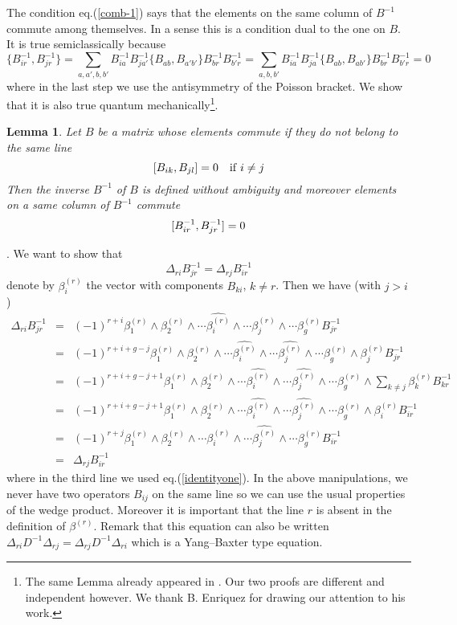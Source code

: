 \documentclass[a4paper,11pt]{article}
\newtheorem{lemma}{Lemma}
\def\proof{\noindent  {\underline {Proof}}. }
\def\square{ {\hfill \vrule height6pt width6pt depth1pt} \bigskip \medskip }
\begin{document}
The condition eq.(\ref{comb-1}) says that the elements on the same column of 
$B^{-1}$  commute among
themselves. In a sense this is a condition dual to the one on $B$. It is true 
semiclassically because
$$
\{ B^{-1}_{ir}, B^{-1}_{jr} \} = \sum_{a,a',b,b'} B^{-1}_{ia} B^{-1}_{ja'}
\{ B_{ab}, B_{a'b'} \} B^{-1}_{br} B^{-1}_{b'r} =
\sum_{a,b,b'} B^{-1}_{ia} B^{-1}_{ja}
\{ B_{ab}, B_{ab'} \} B^{-1}_{br} B^{-1}_{b'r}=0
$$
where in the last step we use the antisymmetry of the Poisson bracket.
We show that it is also true quantum mechanically\footnote{The same Lemma already appeared in  \cite{ER01}. Our two proofs are different and independent however.   We thank B. Enriquez for drawing our attention to his work.}.
\begin{lemma}
Let $B$ be a matrix whose elements commute if they do not belong 
to the same line
$$
\relax [ B_{ik} , B_{jl} ] = 0 \quad {\rm if } \; i \neq j
$$
Then the inverse $B^{-1}$ of $B$ is defined without ambiguity and
moreover elements on a same column of $B^{-1}$ commute
$$
\relax  [ B^{-1}_{ir} , B^{-1}_{jr} ] = 0 
$$
\end{lemma}
\proof
We want to show that
$$
\Delta_{ri}B^{-1}_{jr} = \Delta_{rj}B^{-1}_{ir}
$$
denote by $\beta_i^{(r)}$ the vector with components $B_{ki}$, $k \neq r$. Then
we have (with $j>i$)
\begin{eqnarray*}
\Delta_{ri}B^{-1}_{jr} &=& (-1)^{r+i}
 \beta^{(r)}_1 \wedge \beta^{(r)}_2 \wedge \cdots \widehat{ \beta^{(r)}_i} 
\wedge \cdots \beta^{(r)}_j \wedge \cdots\beta^{(r)}_g 
B^{-1}_{jr}\\
&=& (-1)^{r+i+g-j}\beta^{(r)}_1 \wedge \beta^{(r)}_2 \wedge \cdots \widehat{ \beta^{(r)}_i} 
\wedge \cdots \widehat{\beta^{(r)}_j} \wedge \cdots\beta^{(r)}_g \wedge
\beta^{(r)}_j B^{-1}_{jr} \\
&=& (-1)^{r+i+g-j+1}\beta^{(r)}_1 \wedge \beta^{(r)}_2 \wedge \cdots \widehat{ \beta^{(r)}_i} 
\wedge \cdots \widehat{\beta^{(r)}_j} \wedge \cdots\beta^{(r)}_g \wedge
\sum_{k\neq j}\beta^{(r)}_k B^{-1}_{kr} \\
&=& (-1)^{r+i+g-j+1}\beta^{(r)}_1 \wedge \beta^{(r)}_2 \wedge \cdots \widehat{ \beta^{(r)}_i} 
\wedge \cdots \widehat{\beta^{(r)}_j} \wedge \cdots\beta^{(r)}_g \wedge
\beta^{(r)}_i B^{-1}_{ir} \\
&=&(-1)^{r+j}\beta^{(r)}_1 \wedge \beta^{(r)}_2 \wedge \cdots  \beta^{(r)}_i
\wedge \cdots \widehat{\beta^{(r)}_j} \wedge \cdots\beta^{(r)}_g 
B^{-1}_{ir} \\
&=& \Delta_{rj}B^{-1}_{ir}
\end{eqnarray*}
where in the third line we used eq.(\ref{identityone}). In the above manipulations, we never have two operators $B_{ij}$ on the same line
so we can use the usual properties of the wedge product. Moreover it is important that
the line $r$ is absent in the definition of $\beta^{(r)}$.
Remark that this equation can also be written 
$ \Delta_{ri}D^{-1}  \Delta_{rj}=  \Delta_{rj}D^{-1}  \Delta_{ri}$ which is a Yang--Baxter type equation.
\square
\end{document}
